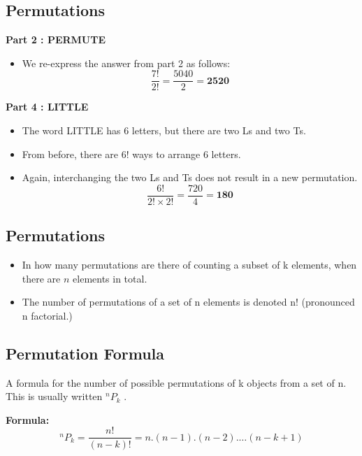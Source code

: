 \documentclass[12pt]{report}
\begin{document}
	\newpage
	\subsection{Permutations}
	\Large

	\textbf{Part 2 : PERMUTE}\\
	\begin{itemize}
		\item We re-express the answer from part 2 as follows:
		\LARGE
		\[\frac{7!}{2!} =  \frac{5040}{2} = \boldsymbol{2520} \]
	\end{itemize}
	
	\textbf{Part 4 : LITTLE}\\
	\begin{itemize}
		\item The word LITTLE has 6 letters, but there are two Ls and two Ts.
		\item From before, there are 6! ways to arrange 6 letters.
		\item Again, interchanging the two Ls and Ts does not result in a new permutation. 
		\LARGE
		\[\frac{6!}{2!\times 2!} =  \frac{720}{4} = \boldsymbol{180} \]
	\end{itemize}
\newpage	
	\subsection{Permutations}

	\begin{itemize}
		\item In how many permutations are there of counting a subset of k elements, when there are $n$ elements in total.
		
		\item The number of permutations of a set of n elements is denoted n! (pronounced n factorial.)
	\end{itemize}
	
	
	\subsection{Permutation Formula}
	
	A formula for the number of possible permutations of k objects from a set of n. This is usually written $^nP_k$ .
	
	\bigskip
	\textbf{Formula:}	
	\[ ^nP_k = \frac{n!}{(n-k)!} =  n.(n-1).(n-2).\ldots(n-k+1) \]
	
\end{document}
